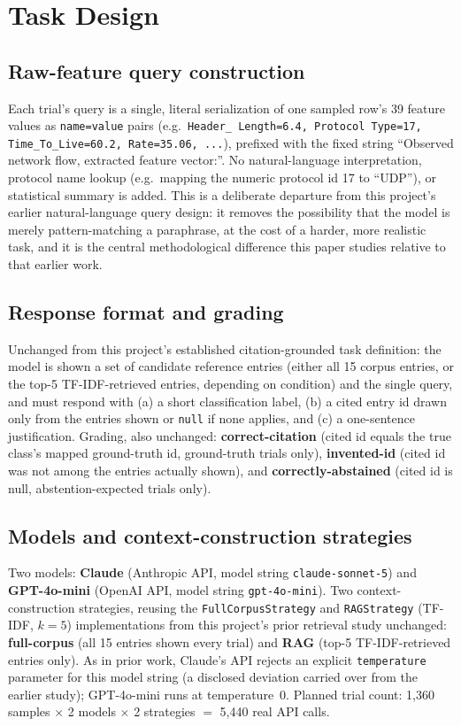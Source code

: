 \documentclass[11pt]{article}
\begin{document}
\section{Task Design}
\label{sec:task}

\subsection{Raw-feature query construction}

Each trial's query is a single, literal serialization of one sampled row's
39 feature values as \texttt{name=value} pairs (e.g.\ \texttt{Header\_
Length=6.4, Protocol Type=17, Time\_To\_Live=60.2, Rate=35.06, ...}),
prefixed with the fixed string ``Observed network flow, extracted feature
vector:''. No natural-language interpretation, protocol name lookup (e.g.\
mapping the numeric protocol id 17 to ``UDP''), or statistical summary is
added. This is a deliberate departure from this project's earlier
natural-language query design: it removes the possibility that the model is
merely pattern-matching a paraphrase, at the cost of a harder, more
realistic task, and it is the central methodological difference this paper
studies relative to that earlier work.

\subsection{Response format and grading}

Unchanged from this project's established citation-grounded task
definition: the model is shown a set of candidate reference entries (either
all 15 corpus entries, or the top-5 TF-IDF-retrieved entries, depending on
condition) and the single query, and must respond with (a) a short
classification label, (b) a cited entry id drawn only from the entries
shown or \texttt{null} if none applies, and (c) a one-sentence
justification. Grading, also unchanged: \textbf{correct-citation} (cited id
equals the true class's mapped ground-truth id, ground-truth trials only),
\textbf{invented-id} (cited id was not among the entries actually shown),
and \textbf{correctly-abstained} (cited id is null, abstention-expected
trials only).

\subsection{Models and context-construction strategies}

Two models: \textbf{Claude} (Anthropic API, model string
\texttt{claude-sonnet-5}) and \textbf{GPT-4o-mini} (OpenAI API, model
string \texttt{gpt-4o-mini}). Two context-construction strategies, reusing
the \texttt{FullCorpusStrategy} and \texttt{RAGStrategy} (TF-IDF, $k{=}5$)
implementations from this project's prior retrieval study unchanged:
\textbf{full-corpus} (all 15 entries shown every trial) and \textbf{RAG}
(top-5 TF-IDF-retrieved entries only). As in prior work, Claude's API
rejects an explicit \texttt{temperature} parameter for this model string
(a disclosed deviation carried over from the earlier study); GPT-4o-mini
runs at temperature~0. Planned trial count: 1{,}360 samples $\times$ 2
models $\times$ 2 strategies $=$ 5{,}440 real API calls.
\end{document}
